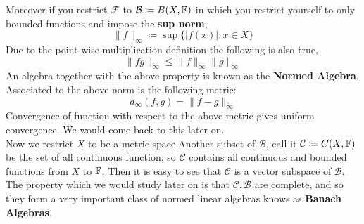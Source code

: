 \documentclass{scrartcl} %
\newcommand{\sF}{\mathcal{F}}
\newcommand{\sC}{\mathcal{C}}
\newcommand{\sB}{\mathcal{B}}
\begin{document}
Moreover if you restrict $\sF$ to 
$\sB \coloneq B(X,\FF)$ in which you
restrict yourself to only bounded functions and impose the \textbf{sup norm},
\[
	\|f\|_\infty \coloneq \sup\{|f(x)| : x \in X\}
\]
Due to the point-wise multiplication definition the 
following is also true,
\[
	\|fg\|_\infty \leq \|f\|_\infty\|g\|_\infty
\]
An algebra together with the above property is known as
the \textbf{Normed Algebra}.\\
Associated to the above norm is the following metric:
\[
d_\infty(f,g) = \|f - g\|_\infty
\]
Convergence of function with respect to the above metric
gives uniform convergence. We would come back to this
later on.\\
Now we restrict $X$ to be a metric space.Another 
subset of $\sB$, call it $\sC \coloneq C(X,\FF)$ be
the set of all continuous function, so $\sC$ contains
all 
continuous and bounded functions from $X$ to $\mathbb F$.
Then it is easy to see that $\sC$ is a vector subspace
of $\sB$.\\
The property which we would study later on is that
$\sC, \sB$ are complete, and so they form a very 
important class of normed linear algebras knows as
\textbf{Banach Algebras}.
\newpage
\end{document}

